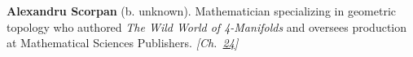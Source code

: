 \textbf{Alexandru Scorpan} (b. unknown). Mathematician specializing in geometric topology who authored \emph{The Wild World of 4-Manifolds} and oversees production at Mathematical Sciences Publishers. \emph{[Ch.~\hyperref[ch:4dspacetime]{24}]}

